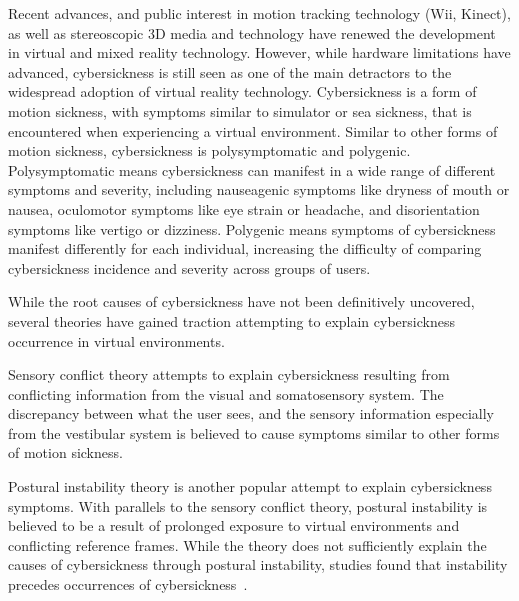 Recent advances, and public interest in motion tracking technology (Wii\textcopyright, Kinect\textcopyright), as well
as stereoscopic 3D media and technology have renewed the development in virtual and mixed reality technology.
However, while hardware limitations have advanced, cybersickness is still seen as one of the main detractors to the
widespread adoption of virtual reality technology.
Cybersickness is a form of motion sickness, with symptoms similar to simulator or sea sickness, that is encountered
when experiencing a virtual environment.
Similar to other forms of motion sickness, cybersickness is polysymptomatic and polygenic.
Polysymptomatic means cybersickness can manifest in a wide range of different symptoms and severity, including
nauseagenic symptoms like dryness of mouth or nausea, oculomotor symptoms like eye strain or headache, and
disorientation symptoms like vertigo or dizziness.
Polygenic means symptoms of cybersickness manifest differently for each individual, increasing the difficulty of
comparing cybersickness incidence and severity across groups of users.

While the root causes of cybersickness have not been definitively uncovered, several theories have gained traction
attempting to explain cybersickness occurrence in virtual environments.

Sensory conflict theory attempts to explain cybersickness resulting from conflicting information from the visual and
somatosensory system.
The discrepancy between what the user sees, and the sensory information especially from the vestibular system is
believed to cause symptoms similar to other forms of motion sickness.

Postural instability theory is another popular attempt to explain cybersickness symptoms.
With parallels to the sensory conflict theory, postural instability is believed to be a result of prolonged exposure
to virtual environments and conflicting reference frames.
While the theory does not sufficiently explain the causes of cybersickness through postural instability, studies
found that instability precedes occurrences of cybersickness~\cite{Riccio1991}.

